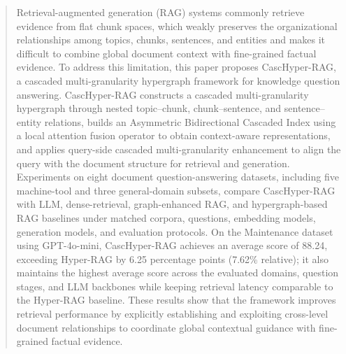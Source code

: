 \documentclass[a4paper,fleqn]{cas-dc}
\begin{document}




\begin{abstract}
Retrieval-augmented generation (RAG) systems commonly retrieve evidence from flat chunk spaces, which weakly preserves the organizational relationships among topics, chunks, sentences, and entities and makes it difficult to combine global document context with fine-grained factual evidence. To address this limitation, this paper proposes CascHyper-RAG, a cascaded multi-granularity hypergraph framework for knowledge question answering. CascHyper-RAG constructs a cascaded multi-granularity hypergraph through nested topic--chunk, chunk--sentence, and sentence--entity relations, builds an Asymmetric Bidirectional Cascaded Index using a local attention fusion operator to obtain context-aware representations, and applies query-side cascaded multi-granularity enhancement to align the query with the document structure for retrieval and generation. Experiments on eight document question-answering datasets, including five machine-tool and three general-domain subsets, compare CascHyper-RAG with LLM, dense-retrieval, graph-enhanced RAG, and hypergraph-based RAG baselines under matched corpora, questions, embedding models, generation models, and evaluation protocols. On the Maintenance dataset using GPT-4o-mini, CascHyper-RAG achieves an average score of 88.24, exceeding Hyper-RAG by 6.25 percentage points (7.62\% relative); it also maintains the highest average score across the evaluated domains, question stages, and LLM backbones while keeping retrieval latency comparable to the Hyper-RAG baseline. These results show that the framework improves retrieval performance by explicitly establishing and exploiting cross-level document relationships to coordinate global contextual guidance with fine-grained factual evidence.
\end{abstract}

\end{document}
